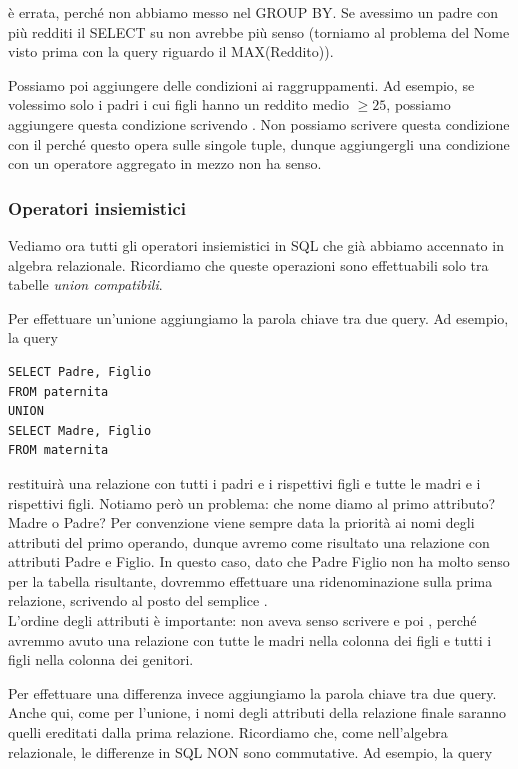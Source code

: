 \documentclass[11pt, a4paper, titlepage, oneside]{scrbook}
\begin{document}
è errata, perché non abbiamo messo  nel GROUP BY. Se avessimo un padre con più redditi il SELECT su   non avrebbe più senso (torniamo al problema del Nome visto prima con la query riguardo il MAX(Reddito)).

Possiamo poi aggiungere delle condizioni ai raggruppamenti. Ad esempio, se volessimo solo i padri i cui figli hanno un reddito medio $\geq 25$, possiamo aggiungere questa condizione scrivendo . Non possiamo scrivere questa condizione con il  perché questo opera sulle singole tuple, dunque aggiungergli una condizione con un operatore aggregato in mezzo non ha senso.

\subsubsection*{Operatori insiemistici}

Vediamo ora tutti gli operatori insiemistici in SQL che già abbiamo accennato in algebra relazionale. Ricordiamo che queste operazioni sono effettuabili solo tra tabelle \textit{union compatibili}.

Per effettuare un'unione aggiungiamo la parola chiave  tra due query. Ad esempio, la query

\begin{lstlisting}
SELECT Padre, Figlio
FROM paternita
UNION
SELECT Madre, Figlio
FROM maternita
\end{lstlisting}

restituirà una relazione con tutti i padri e i rispettivi figli e tutte le madri e i rispettivi figli. Notiamo però un problema: che nome diamo al primo attributo? Madre o Padre? Per convenzione viene sempre data la priorità ai nomi degli attributi del primo operando, dunque avremo come risultato una relazione con attributi Padre e Figlio. In questo caso, dato che Padre Figlio non ha molto senso per la tabella risultante, dovremmo effettuare una ridenominazione sulla prima relazione, scrivendo  al posto del semplice .  \\
\NB L'ordine degli attributi è importante: non aveva senso scrivere  e poi , perché avremmo avuto una relazione con tutte le madri nella colonna dei figli e tutti i figli nella colonna dei genitori.

Per effettuare una differenza invece aggiungiamo la parola chiave  tra due query. Anche qui, come per l'unione, i nomi degli attributi della relazione finale saranno quelli ereditati dalla prima relazione. Ricordiamo che, come nell'algebra relazionale, le differenze in SQL NON sono commutative. Ad esempio, la query 
\end{document}
